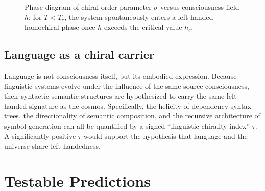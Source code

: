 \documentclass[10pt,a4paper]{article}
\begin{document}
\begin{figure}[htbp]
\centering
{}
\caption{Phase diagram of chiral order parameter $\sigma$ versus consciousness field $h$: for $T<T_c$, the system spontaneously enters a left-handed homochiral phase once $h$ exceeds the critical value $h_c$.}
\label{fig:phase}
\end{figure}

\subsection*{Language as a chiral carrier}
Language is not consciousness itself, but its embodied expression. Because linguistic systems evolve under the influence of the same source-consciousness, their syntactic-semantic structures are hypothesized to carry the same left-handed signature as the cosmos. Specifically, the helicity of dependency syntax trees, the directionality of semantic composition, and the recursive architecture of symbol generation can all be quantified by a signed ``linguistic chirality index'' $\tau$. A significantly positive $\tau$ would support the hypothesis that language and the universe share left-handedness.

\section*{Testable Predictions}
\end{document}
